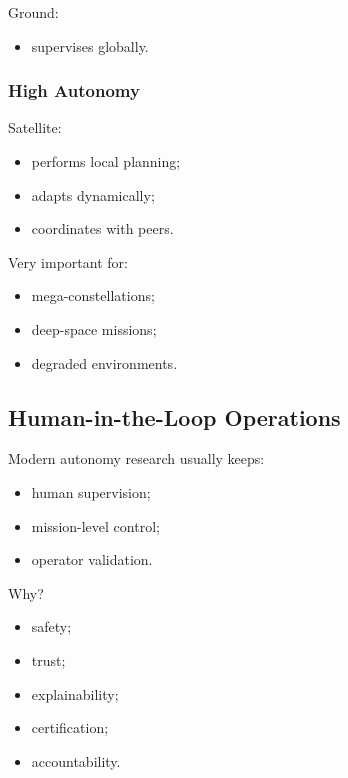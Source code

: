\documentclass[10pt,a4paper,twocolumn]{article}
\begin{document}
Ground:
\begin{itemize}
    \item supervises globally.
\end{itemize}


\subsubsection*{High Autonomy}

Satellite:
\begin{itemize}
    \item performs local planning;
    \item adapts dynamically;
    \item coordinates with peers.
\end{itemize}

Very important for:
\begin{itemize}
    \item mega-constellations;
    \item deep-space missions;
    \item degraded environments.
\end{itemize}


\subsection{Human-in-the-Loop Operations}

Modern autonomy research usually keeps:
\begin{itemize}
    \item human supervision;
    \item mission-level control;
    \item operator validation.
\end{itemize}

Why?
\begin{itemize}
    \item safety;
    \item trust;
    \item explainability;
    \item certification;
    \item accountability.
\end{itemize}
\end{document}
